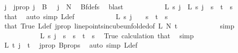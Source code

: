 \begin{isabellebody}
\ j\ \ j{\isacharunderscore}{\kern0pt}prop{\isacharcolon}{\kern0pt}\ {\isachardoublequoteopen}j\ {\isasymin}\ B\ {}\ {\isasymand}\ j\ {\isacharless}{\kern0pt}\ N{\isacharprime}{\kern0pt}{\isachardoublequoteclose}\ \isamarkupfalse%
\ Bf{\isacharunderscore}{\kern0pt}defs\ \isamarkupfalse%
\ blast\isanewline
\ \ \ \ \ \ \ \ \isamarkupfalse%
\ \isamarkupfalse%
\ {\isachardoublequoteopen}L{\isacharprime}{\kern0pt}\ s\ j\ {\isacharequal}{\kern0pt}\ L\ s\ j{\isachardoublequoteclose}\ \ {\isachardoublequoteopen}s\ {\isacharless}{\kern0pt}\ t{\isachardoublequoteclose}\ \ s\ \isamarkupfalse%
\ that\ \isamarkupfalse%
\ {\isacharparenleft}{\kern0pt}auto\ simp{\isacharcolon}{\kern0pt}\ L{\isacharprime}{\kern0pt}{\isacharunderscore}{\kern0pt}def{\isacharparenright}{\kern0pt}\isanewline
\ \ \ \ \ \ \ \ \isamarkupfalse%
\ \isamarkupfalse%
\ {\isachardoublequoteopen}L\ s\ j\ {\isacharequal}{\kern0pt}\ {}{\isachardoublequoteclose}\ \ {\isachardoublequoteopen}s\ {\isacharless}{\kern0pt}\ t{\isachardoublequoteclose}\ \ s\ \ \isamarkupfalse%
\ that\ True\ L{\isacharunderscore}{\kern0pt}def\ j{\isacharunderscore}{\kern0pt}prop\ line{\isacharunderscore}{\kern0pt}points{\isacharunderscore}{\kern0pt}in{\isacharunderscore}{\kern0pt}cube{\isacharunderscore}{\kern0pt}unfolded{\isacharbrackleft}{\kern0pt}of\ L\ N{\isacharprime}{\kern0pt}\ t{\isacharbrackright}{\kern0pt}\isanewline
\ \ \ \ \ \ \ \ \ \ \isamarkupfalse%
\ simp\isanewline
\ \ \ \ \ \ \ \ \isamarkupfalse%
\ \isamarkupfalse%
\ {\isachardoublequoteopen}L{\isacharprime}{\kern0pt}\ s\ j\ {\isacharequal}{\kern0pt}\ s{\isachardoublequoteclose}\ \ {\isachardoublequoteopen}s\ {\isacharless}{\kern0pt}\ t{\isachardoublequoteclose}\ \ s\ \isamarkupfalse%
\ True\ calculation\ that\ \isamarkupfalse%
\ simp\isanewline
\ \ \ \ \ \ \ \ \isamarkupfalse%
\ \isamarkupfalse%
\ {\isachardoublequoteopen}L{\isacharprime}{\kern0pt}\ t\ j\ {\isacharequal}{\kern0pt}\ t{\isachardoublequoteclose}\ \isamarkupfalse%
\ j{\isacharunderscore}{\kern0pt}prop\ B{\isacharunderscore}{\kern0pt}props\ \isamarkupfalse%
\ {\isacharparenleft}{\kern0pt}auto\ simp{\isacharcolon}{\kern0pt}\ L{\isacharprime}{\kern0pt}{\isacharunderscore}{\kern0pt}def{\isacharparenright}{\kern0pt}\isanewline

\end{isabellebody}
